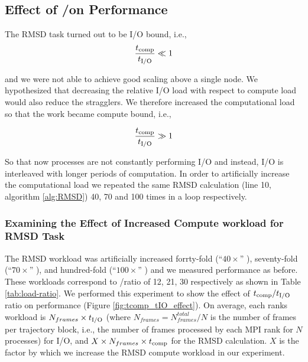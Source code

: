 \subsection{Effect of \tcomp/\tIO on Performance}
\label{bound}

The RMSD task turned out to be I/O bound, i.e.,
\begin{gather*}
  \frac{{t}_{\text{comp}}}{{t}_{\text{I/O}}} \ll 1
\end{gather*}

and we were not able to achieve good scaling above a single node. 
We hypothesized that decreasing the relative I/O load with respect to compute load would also reduce the stragglers. 
We therefore increased the computational load so that the work became compute bound, i.e.,

\begin{gather*}
  \frac{{t}_{\text{comp}}}{{t}_{\text{I/O}}} \gg 1
\end{gather*}

So that now processes are not constantly performing I/O and instead, I/O is interleaved with longer periods of computation.
In order to artificially increase the computational load we repeated the same RMSD calculation (line 10, algorithm \ref{alg:RMSD}) 40, 70 and 100 times in a loop respectively.

\subsubsection{Examining the Effect of Increased Compute workload for RMSD Task}
The RMSD workload was artificially increased forrty-fold (``$40\times$'' ), seventy-fold (``$70\times$'' ), and hundred-fold (``$100\times$'' ) and we measured performance as before. 
These workloads correspond to \tcomp/\tIO ratio of 12, 21, 30 respectively as shown in Table \ref{tab:load-ratio}.
We performed this experiment to show the effect of ${t}_{\text{comp}}/{t}_{\text{I/O}}$ ratio on performance (Figure \ref{fig:tcomp_tIO_effect}).
On average, each rank\textsc{}s workload is $N_{frames} \times {t}_{\text{I/O}} $ (where $N_{frames}=N_{frames}^{total}/N$ is the
number of frames per trajectory block, i.e., the number of frames
processed by each MPI rank for $N$ processes) for I/O, and
$X \times N_{frames} \times {t}_{\text{comp}}$ for the RMSD calculation. 
$X$ is the factor by which we increase the RMSD compute workload in our experiment.


